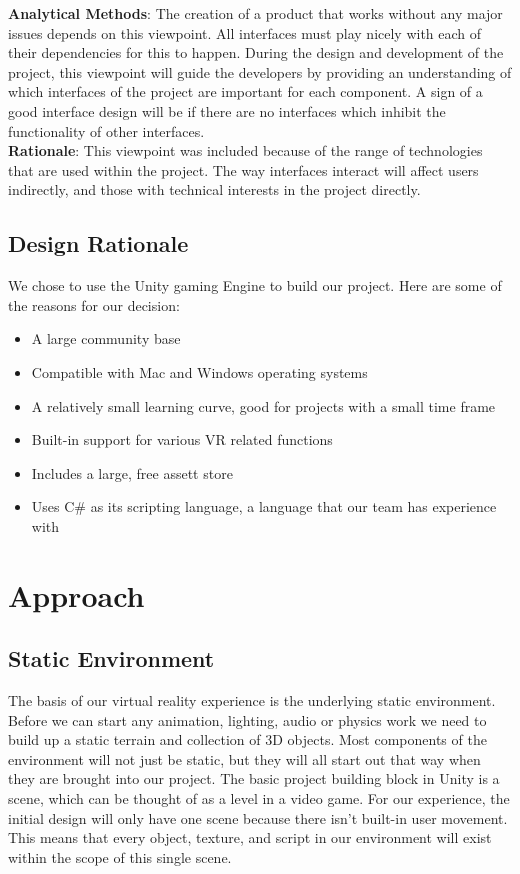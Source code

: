 \documentclass[10pt,journal,compsoc,onecolumn, draftclsnofoot]{IEEEtran}
\begin{document}
\hangindent=0.5cm \textbf{Analytical Methods}: The creation of a product that works without any major issues depends on this viewpoint.
All interfaces must play nicely with each of their dependencies for this to happen.
During the design and development of the project, this viewpoint will guide the developers by providing an understanding of which interfaces of the project are important for each component.
A sign of a good interface design will be if there are no interfaces which inhibit the functionality of other interfaces.\\

\hangindent=0.5cm \textbf{Rationale}: This viewpoint was included because of the range of technologies that are used within the project.
The way interfaces interact will affect users indirectly, and those with technical interests in the project directly. \\


\subsection{Design Rationale}
We chose to use the Unity gaming Engine to build our project. Here are some of the reasons for our decision:
\begin{itemize}
  \item A large community base
  \item Compatible with Mac and Windows operating systems
  \item A relatively small learning curve, good for projects with a small time frame
  \item Built-in support for various VR related functions
  \item Includes a large, free assett store
  \item Uses C\# as its scripting language, a language that our team has experience with
\end{itemize}

\section{Approach}
\subsection{Static Environment}
The basis of our virtual reality experience is the underlying static
environment. Before we can start any animation, lighting, audio or physics
work we need to build up a static terrain and collection of 3D objects.
Most components of the environment will not just be static, but they will all
start out that way when they are brought into our project. The basic project
building block in Unity is a scene, which can be thought of as a level in a
video game. \cite{microsoft_mag} For our experience, the initial design will
only have one scene because there isn't built-in user movement. This means that
every object, texture, and script in our environment will exist within the
scope of this single scene.
\end{document}
